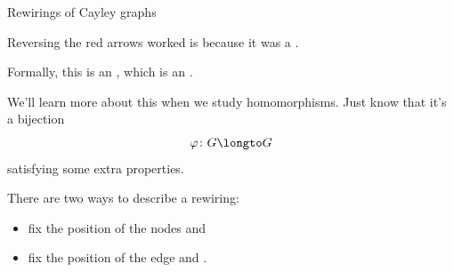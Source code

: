 \documentclass[8pt, handout]{beamer}
\newcommand{\Pause}{}
\begin{document}
\begin{frame}{Rewirings of Cayley graphs}

  Reversing the red arrows worked is because it was a
  . \medskip\Pause

  Formally, this is an , which is an
  . \medskip\Pause

  We'll learn more about this when we study homomorphisms. \Pause Just
  know that it's a bijection
  \[
  \varphi\colon G\longto G
  \]
  satisfying some extra properties. \medskip\Pause

  There are two ways to describe a rewiring: \vspace{-1mm}
  \begin{itemize}
  \item fix the position of the nodes and  \smallskip\Pause
  \item fix the position of the edge and . \medskip\Pause
  \end{itemize}
  

\end{frame}
\end{document}
